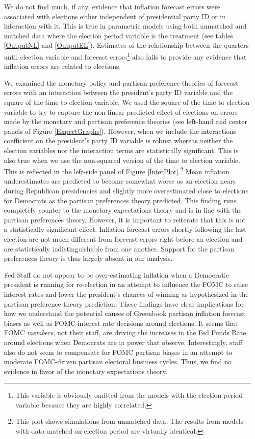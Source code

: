 \documentclass[a4paper]{article}\usepackage{graphicx, color}
\begin{document}
We do not find much, if any, evidence that inflation forecast errors were associated with elections either independent of presidential party ID or in interaction with it. This is true in parametric models using both unmatched and matched data where the election period variable is the treatment (see tables \ref{OutputNL} and \ref{OutputEL}). Estimates of the relationship between the quarters until election variable and forecast errors\footnote{This variable is obviously omitted from the models with the election period variable because they are highly correlated.} also fails to provide any evidence that inflation errors are related to elections. 

We examined the monetary policy and partisan preference theories of forecast errors with an interaction between the president's party ID variable and the square of the time to election variable. We used the square of the time to election variable to try to capture the non-linear predicted effect of elections on errors made by the monetary and partisan preference theories (see left-hand and center panels of Figure \ref{ExpectGraphs}). However, when we include the interactions coefficient on the president's party ID variable is robust whereas neither the election variables nor the interaction terms are statistically significant. This is also true when we use the non-squared version of the time to election variable. This is reflected in the left-side panel of Figure \ref{InterPlot}.\footnote{This plot shows simulations from unmatched data. The results from models with data matched on election period are virtually identical.} Mean inflation underestimates are predicted to become somewhat worse as an election nears during Republican presidencies and slightly more overestimated close to elections for Democrats as the partisan preferences theory predicted. This finding runs completely counter to the monetary expectations theory and is in line with the partisan preferences theory. However, it is important to reiterate that this is not a statistically significant effect. Inflation forecast errors shortly following the last election are not much different from forecast errors right before an election and are statistically indistinguishable from one another. Support for the partisan preferences theory is thus largely absent in our analysis.

Fed Staff do not appear to be over-estimating inflation when a Democratic president is running for re-election in an attempt to influence the FOMC to raise interest rates and lower the president's chances of winning as hypothesized in the partisan preference theory prediction. These findings have clear implications for how we understand the potential causes of Greenbook partisan inflation forecast biases as well as FOMC interest rate decisions around elections. It seems that FOMC \emph{members}, not their staff, are driving the increases in the Fed Funds Rate around elections when Democrats are in power that \cite{Clark2012} observe. Interestingly, staff also do not seem to compensate for FOMC partisan biases in an attempt to moderate FOMC-driven partisan electoral business cycles. Thus, we find no evidence in favor of the monetary expectations theory.
\end{document}
